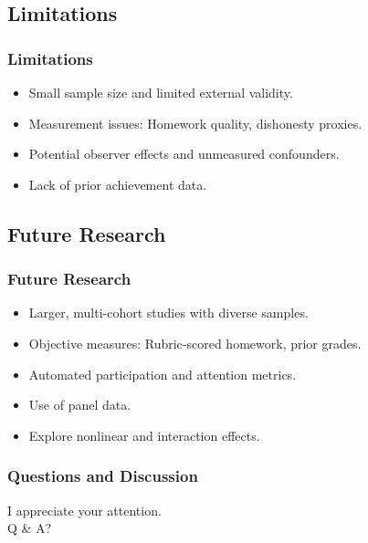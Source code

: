 \documentclass{beamer} %
\theoremstyle{definition}
\begin{document}
	\subsection{Limitations}
	\begin{frame}
		\frametitle{Limitations}
		\begin{itemize}
			\item Small sample size and limited external validity.
			\item Measurement issues: Homework quality, dishonesty proxies.
			\item Potential observer effects and unmeasured confounders.
			\item Lack of prior achievement data.
		\end{itemize}
	\end{frame}
	
	\subsection{Future Research}
	\begin{frame}
		\frametitle{Future Research}
		\begin{itemize}
			\item Larger, multi-cohort studies with diverse samples.
			\item Objective measures: Rubric-scored homework, prior grades.
			\item Automated participation and attention metrics.
			\item Use of panel data.
			\item Explore nonlinear and interaction effects.
		\end{itemize}
	\end{frame}
	
	\begin{frame}
		\frametitle{Questions and Discussion}
		\begin{center}
			I appreciate your attention.\\
			\vspace{1em}
			Q \& A?
		\end{center}
	\end{frame}
	
\end{document}
